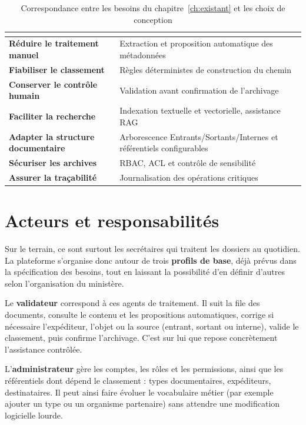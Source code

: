 \begin{table}[htbp]
\centering
\caption{Correspondance entre les besoins du chapitre~\ref{ch:existant} et les choix de conception}
\label{tab:besoins-conception-ch4}
\small
\renewcommand{\arraystretch}{1.55}
\begingroup
{}
\begin{tabularx}{\textwidth}{@{}>{\bfseries}Y Y@{}}
\toprule
{}
 &
 \\
\midrule
Réduire le traitement manuel &
Extraction et proposition automatique des métadonnées \\
Fiabiliser le classement &
Règles déterministes de construction du chemin \\
Conserver le contrôle humain &
Validation avant confirmation de l'archivage \\
Faciliter la recherche &
Indexation textuelle et vectorielle, assistance RAG \\
Adapter la structure documentaire &
Arborescence Entrants/Sortants/Internes et référentiels configurables \\
Sécuriser les archives &
RBAC, ACL et contrôle de sensibilité \\
Assurer la traçabilité &
Journalisation des opérations critiques \\
\bottomrule
\end{tabularx}
\endgroup
\end{table}

\section{Acteurs et responsabilités}

Sur le terrain, ce sont surtout les secrétaires qui traitent les dossiers au quotidien. La plateforme s'organise donc autour de trois \textbf{profils de base}, déjà prévus dans la spécification des besoins, tout en laissant la possibilité d'en définir d'autres selon l'organisation du ministère.

Le \textbf{validateur} correspond à ces agents de traitement. Il suit la file des documents, consulte le contenu et les propositions automatiques, corrige si nécessaire l'expéditeur, l'objet ou la source (entrant, sortant ou interne), valide le classement, puis confirme l'archivage. C'est sur lui que repose concrètement l'assistance contrôlée.

L'\textbf{administrateur} gère les comptes, les rôles et les permissions, ainsi que les référentiels dont dépend le classement : types documentaires, expéditeurs, destinataires. Il peut ainsi faire évoluer le vocabulaire métier (par exemple ajouter un type ou un organisme partenaire) sans attendre une modification logicielle lourde.

